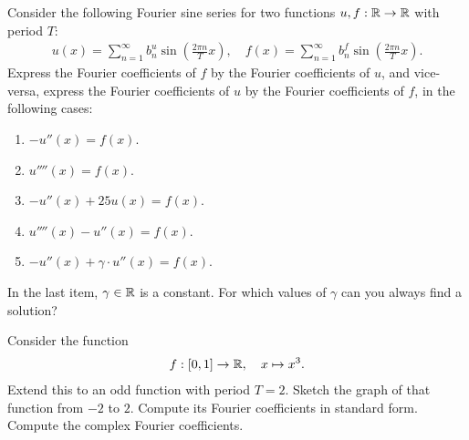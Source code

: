 \documentclass[11pt]{article}
\begin{document}


\begin{exercise}
    Consider the following Fourier sine series for two functions $u, f : \mathbb{R} \to \mathbb{R}$ with period $T$:
    \begin{align*}
        u(x) = \sum_{n=1}^{\infty} b_{n}^{u} \sin\left( \frac{2\pi n}{T} x \right)
        ,
        \quad 
        f(x) = \sum_{n=1}^{\infty} b_{n}^{f} \sin\left( \frac{2\pi n}{T} x \right)
        .
    \end{align*}
    Express the Fourier coefficients of $f$ by the Fourier coefficients of $u$, and vice-versa, express the Fourier coefficients of $u$ by the Fourier coefficients of $f$,
    in the following cases:
    \begin{enumerate}[label=(\alph*)]
     \item 
     $-u''(x) = f(x)$.
     \item 
     $u''''(x) = f(x)$.
     \item 
     $-u''(x) + 25 u(x) = f(x)$.
     \item 
     $u''''(x) - u''(x) = f(x)$.
     \item 
     $-u''(x) + \gamma \cdot u''(x) = f(x)$.
    \end{enumerate}
    In the last item, $\gamma \in \mathbb{R}$ is a constant. For which values of $\gamma$ can you always find a solution?
\end{exercise}
\begin{solution}     
\end{solution}

\begin{exercise}
    Consider the function 
    \begin{align*}
        f : [0,1] \to \mathbb{R}, \quad x \mapsto x^{3}.
    \end{align*}
    Extend this to an odd function with period $T = 2$. Sketch the graph of that function from $-2$ to $2$.
    Compute its Fourier coefficients in standard form. Compute the complex Fourier coefficients.
\end{exercise}
\begin{solution}     
\end{solution}
\end{document}
